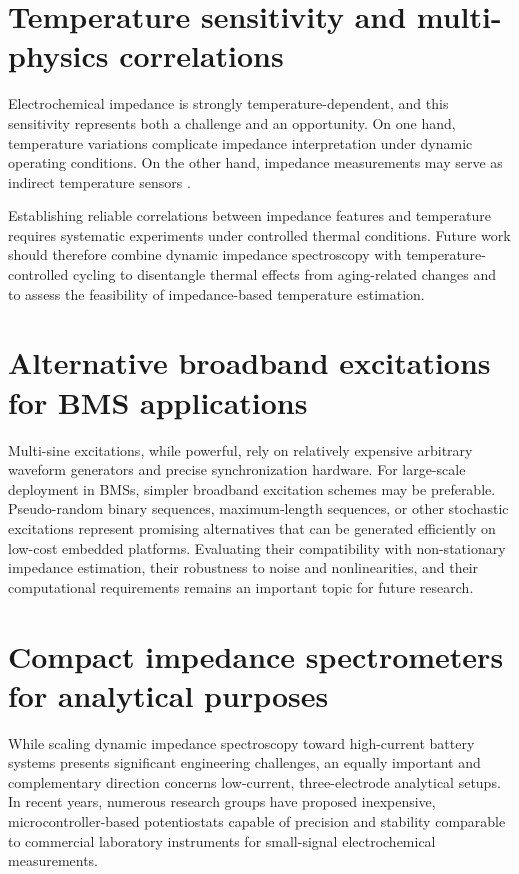 \section{Temperature sensitivity and multi-physics correlations}

Electrochemical impedance is strongly temperature-dependent, and this sensitivity represents both a challenge and an opportunity. On one hand, temperature variations complicate impedance interpretation under dynamic operating conditions. On the other hand, impedance measurements may serve as indirect temperature sensors \cite{duRevolutionizingSafety2025}.

Establishing reliable correlations between impedance features and temperature requires systematic experiments under controlled thermal conditions. Future work should therefore combine dynamic impedance spectroscopy with temperature-controlled cycling to disentangle thermal effects from aging-related changes and to assess the feasibility of impedance-based temperature estimation.

\section{Alternative broadband excitations for BMS applications}

Multi-sine excitations, while powerful, rely on relatively expensive arbitrary waveform generators and precise synchronization hardware. For large-scale deployment in BMSs, simpler broadband excitation schemes may be preferable.
Pseudo-random binary sequences, maximum-length sequences, or other stochastic excitations represent promising alternatives that can be generated efficiently on low-cost embedded platforms. Evaluating their compatibility with non-stationary impedance estimation, their robustness to noise and nonlinearities, and their computational requirements remains an important topic for future research.

\section{Compact impedance spectrometers for analytical purposes}

While scaling dynamic impedance spectroscopy toward high-current battery systems presents significant engineering challenges, an equally important and complementary direction concerns low-current, three-electrode analytical setups. In recent years, numerous research groups have proposed inexpensive, microcontroller-based potentiostats capable of precision and stability comparable to commercial laboratory instruments for small-signal electrochemical measurements.

